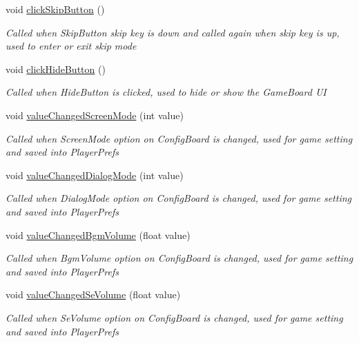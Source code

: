 \begin{DoxyCompactItemize}
void \hyperlink{classdoki_unity_1_1_world_control_a7d095ab3d2a45d6317ab253259915224}{click\+Skip\+Button} ()
\begin{DoxyCompactList}\small\item\em Called when Skip\+Button skip key is down and called again when skip key is up, used to enter or exit skip mode \end{DoxyCompactList}\item 
void \hyperlink{classdoki_unity_1_1_world_control_a801410629965a66e07a93f8e2e228ab0}{click\+Hide\+Button} ()
\begin{DoxyCompactList}\small\item\em Called when Hide\+Button is clicked, used to hide or show the Game\+Board UI \end{DoxyCompactList}\item 
void \hyperlink{classdoki_unity_1_1_world_control_a8ccb0f53a4738e830edeacd39f06934f}{value\+Changed\+Screen\+Mode} (int value)
\begin{DoxyCompactList}\small\item\em Called when Screen\+Mode option on Config\+Board is changed, used for game setting and saved into Player\+Prefs \end{DoxyCompactList}\item 
void \hyperlink{classdoki_unity_1_1_world_control_a39d7cb1affea057d1e2d82706e2884e9}{value\+Changed\+Dialog\+Mode} (int value)
\begin{DoxyCompactList}\small\item\em Called when Dialog\+Mode option on Config\+Board is changed, used for game setting and saved into Player\+Prefs \end{DoxyCompactList}\item 
void \hyperlink{classdoki_unity_1_1_world_control_a7107e89917c673c363c3f9bc5d29e409}{value\+Changed\+Bgm\+Volume} (float value)
\begin{DoxyCompactList}\small\item\em Called when Bgm\+Volume option on Config\+Board is changed, used for game setting and saved into Player\+Prefs \end{DoxyCompactList}\item 
void \hyperlink{classdoki_unity_1_1_world_control_a48b8e450a703e229cc2e61e561b6f34e}{value\+Changed\+Se\+Volume} (float value)
\begin{DoxyCompactList}\small\item\em Called when Se\+Volume option on Config\+Board is changed, used for game setting and saved into Player\+Prefs \end{DoxyCompactList}\item 

\end{DoxyCompactItemize}
